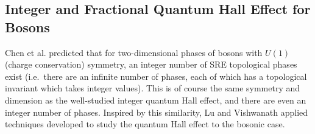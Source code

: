 


\subsection{Integer and Fractional Quantum Hall Effect for Bosons}
\label{subsec::FQHEintro}

Chen et al. predicted that for two-dimensional phases of bosons with $U(1)$ (charge conservation) symmetry, an integer number of SRE topological phases exist (i.e.~there are an infinite number of phases, each of which has a topological invariant which takes integer values). This is of course the same symmetry and dimension as the well-studied integer quantum Hall effect, and there are even an integer number of phases. Inspired by this similarity, Lu and Vishwanath \cite{LuVishwanath} applied techniques developed to study the quantum Hall effect to the bosonic case.

